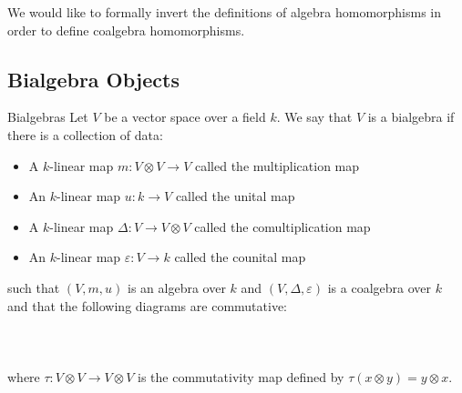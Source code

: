 \documentclass[a4paper]{article}
\begin{document}
We would like to formally invert the definitions of algebra homomorphisms in order to define coalgebra homomorphisms. 

\subsection{Bialgebra Objects}
\begin{defn}{Bialgebras}{} Let $V$ be a vector space over a field $k$. We say that $V$ is a bialgebra if there is a collection of data: 
\begin{itemize}
\item A $k$-linear map $m:V\otimes V\to V$ called the multiplication map
\item An $k$-linear map $u:k\to V$ called the unital map
\item A $k$-linear map $\Delta:V\to V\otimes V$ called the comultiplication map
\item An $k$-linear map $\varepsilon:V\to k$ called the counital map
\end{itemize}
such that $(V,m,u)$ is an algebra over $k$ and $(V,\Delta,\varepsilon)$ is a coalgebra over $k$ and that the following diagrams are commutative: \\~\\
\\~\\
where $\tau:V\otimes V\to V\otimes V$ is the commutativity map defined by $\tau(x\otimes y)=y\otimes x$. 
\end{defn}
\end{document}
